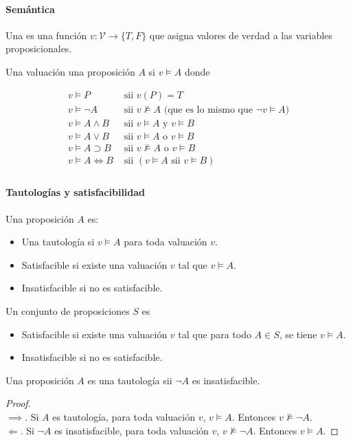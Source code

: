 \paragraph{Semántica}

Una  es una función $v:\mathcal{V}\to\{T,F\}$ que asigna valores de verdad a las variables proposicionales.

Una valuación  una proposición $A$ si $v \models A$ donde

\begin{align*}
  v \models P &\text{ sii } v(P) = T \\
  v \models \lnot A &\text{ sii } v \not\models A \text{ (que es lo mismo que $\lnot v \models A$)} \\
  v \models A \land B &\text{ sii } v \models A \text{ y } v \models B \\
  v \models A \lor B &\text{ sii } v \models A \text{ o } v \models B \\
  v \models A \supset B &\text{ sii } v \not\models A \text{ o } v \models B \\
  v \models A \iff B &\text{ sii } (v \models A \text{ sii } v \models B) \\
\end{align*}

\paragraph{Tautologías y satisfacibilidad}

Una proposición $A$ es:
\begin{itemize}
  \item Una tautología si $v \models A$ para toda valuación $v$.
  \item Satisfacible si existe una valuación $v$ tal que $v \models A$.
  \item Insatisfacible si no es satisfacible.
\end{itemize}

Un conjunto de proposiciones $S$ es
\begin{itemize}
  \item Satisfacible si existe una valuación $v$ tal que para todo $A \in S$, se tiene $v \models A$.
  \item Insatisfacible si no es satisfacible.
\end{itemize}

\begin{teo}
  Una proposición $A$ es una tautología sii $\lnot A$ es insatisfacible.
\end{teo}
\begin{proof}
  \hspace{0.5em}\\
  $\implies$. Si $A$ es tautología, para toda valuación $v$, $v \models A$. Entonces $v \not\models \lnot A$.\\
  $\Longleftarrow$. Si $\lnot A$ es insatisfacible, para toda valuación $v$, $v \not\models \lnot A$. Entonces $v \models A$.
\end{proof}

